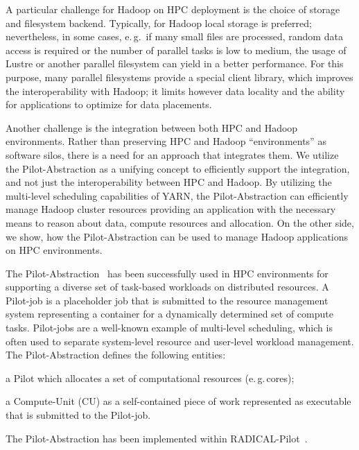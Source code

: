 A particular challenge for Hadoop on HPC deployment is the choice of storage and filesystem backend.
Typically, for Hadoop local storage is preferred; nevertheless, in some cases, e.\,g.\ if many small files are processed, random data access is required or the number of parallel tasks is low to medium, the usage of Lustre or another parallel filesystem can yield in a better performance.
For this purpose, many parallel filesystems provide a special client library, which improves the interoperability with Hadoop; it limits however data locality and the ability for applications to optimize for data placements.

Another challenge is the integration between both HPC and Hadoop environments.
Rather than preserving HPC and Hadoop ``environments'' as software silos, there is a need for an approach that integrates them. 
We utilize the Pilot-Abstraction as a unifying concept to efficiently support the integration, and not just the interoperability between HPC and Hadoop.
By utilizing the multi-level scheduling capabilities of YARN, the Pilot-Abstraction can efficiently manage Hadoop cluster resources providing an application with the necessary means to reason about data, compute resources and allocation.
On the other side, we show, how the Pilot-Abstraction can be used to manage Hadoop applications on HPC environments.

The Pilot-Abstraction~\cite{luckow2012pstar} has been successfully used in HPC environments for supporting a diverse set of task-based workloads on distributed resources.
A Pilot-job is a placeholder job that is submitted to the resource management system representing a container for a dynamically determined set of compute tasks.
Pilot-jobs are a well-known example of multi-level scheduling, which is often used to separate system-level resource and user-level workload management.
The Pilot-Abstraction defines the following entities:
\begin{inparaenum} [(i)]
    \item a Pilot which allocates a set of computational resources (e.\,g.\,cores);
    \item  a Compute-Unit (CU) as a self-contained piece of work represented as executable that is submitted to the Pilot-job.
\end{inparaenum}
The Pilot-Abstraction has been implemented within RADICAL-Pilot~\cite{merzky2018design}.


